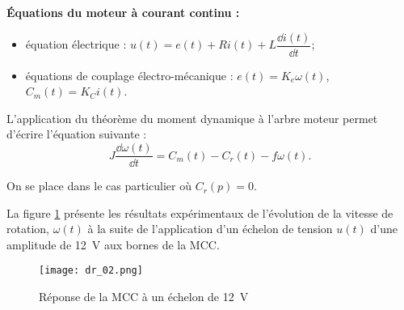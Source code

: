\textbf{Équations du moteur à courant continu :}
\begin{multicols}{2}
\begin{itemize}
\item équation électrique : $u(t)=e(t)+Ri(t)+L\dfrac{\dd i(t)}{\dd t}$;
\item équations de couplage électro-mécanique : $e(t)=K_e \omega(t)$, $C_m(t)=K_C i(t)$.
\end{itemize}
\end{multicols}


%
%
%

L'application du théorème du moment dynamique à l'arbre moteur permet d'écrire l'équation suivante : 
$$
J\dfrac{\dd \omega(t)}{\dd t}  = C_m(t)-C_r(t)-f\omega(t).
$$


On se place dans le cas particulier où $C_r(p) = 0$.



La figure \ref{dr_02} présente les résultats expérimentaux de l’évolution de la vitesse de rotation, $\omega(t)$ à la suite de l’application d’un échelon de tension $u(t)$ d’une amplitude de \SI{12}{V} aux bornes de la MCC. %

\begin{figure}[!h]
\centering
\texttt{[image: dr\_02.png]}
\caption{Réponse de la MCC à un échelon de \SI{12}{V}\label{dr_02}}
\end{figure}


